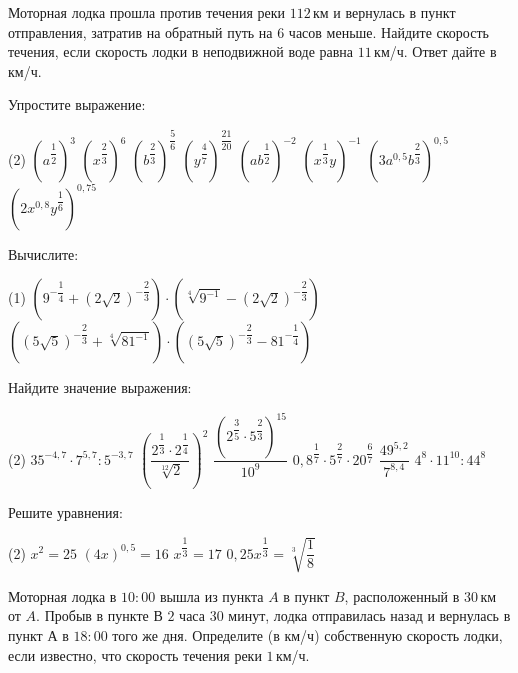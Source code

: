 \begin{class}[number=3]
\begin{listofex}
		\item Моторная лодка прошла против течения реки \(112\) км и вернулась в пункт отправления, затратив на обратный путь на \(6\) часов меньше. Найдите скорость течения, если скорость лодки в неподвижной воде равна \(11\) км/ч. Ответ дайте в км/ч.
	\end{listofex}
\end{class}

\begin{class}[number=4]
	\begin{listofex}
		\item Упростите выражение:
		\begin{tasks}(2)
			\task \( (a^{\dfrac{1}{2}})^3 \)
			\task \( (x^{\dfrac{2}{3}})^6 \)
			\task \( (b^{\dfrac{2}{3}})^{\dfrac{5}{6}} \)
			\task \( (y^{\dfrac{4}{7}})^{\dfrac{21}{20}} \)
			\task \( (ab^{\dfrac{1}{2}})^{-2} \)
			\task \( (x^{\dfrac{1}{3}}y)^{-1} \)
			\task \( (3a^{0,5}b^{\dfrac{2}{3}})^{0,5} \)
			\task \( (2x^{0,8}y^{\dfrac{1}{6}})^{0,75} \)
		\end{tasks}
		\item Вычислите:
		\begin{tasks}(1)
			\task \( ( 9^{-\dfrac{1}{4}}+(2\sqrt{2})^{-\dfrac{2}{3}} ) \cdot ( \sqrt[4]{9^{-1}} - (2\sqrt{2})^{-\dfrac{2}{3}} ) \)
			\task \( ( (5\sqrt{5})^{-\dfrac{2}{3}} + \sqrt[4]{81^{-1}} ) \cdot ( (5\sqrt{5})^{-\dfrac{2}{3}} - 81^{-\dfrac{1}{4}} ) \)
		\end{tasks}
		\item Найдите значение выражения:
		\begin{tasks}(2)
			\task \( 35^{-4,7} \cdot 7^{5,7} : 5^{-3,7} \)
			\task \( \left( \dfrac{2^{\dfrac{1}{3}}\cdot2^{\dfrac{1}{4}}}{\sqrt[12]{2}} \right)^2 \)
			\task \( \dfrac{(2^\dfrac{3}{5}\cdot5^{\dfrac{2}{3}})^{15}}{10^9} \)
			\task \( 0,8^{\dfrac{1}{7}}\cdot5^{\dfrac{2}{7}}\cdot20^{\dfrac{6}{7}} \)
			\task \( \dfrac{49^{5,2}}{7^{8,4}} \)
			\task \( 4^8\cdot11^{10}:44^8 \)
		\end{tasks}
		\item Решите уравнения:
		\begin{tasks}(2)
			\task \( x^2 = 25 \)
			\task \( (4x)^{0,5} = 16 \)
			\task \( x^{\dfrac{1}{3}} = 17 \)
			\task \( 0,25x^{\dfrac{1}{3}} = \sqrt[3]{\dfrac{1}{8}} \)
		\end{tasks}
		\item Моторная лодка в \(10:00\) вышла из пункта \(A\) в пункт \(B\), расположенный в \(30\) км от \(A\). Пробыв в пункте В \(2\) часа \(30\) минут, лодка отправилась назад и вернулась в пункт А в \(18:00\) того же дня. Определите (в км/ч) собственную скорость лодки, если известно, что скорость течения реки \(1\) км/ч.
	\end{listofex}
\end{class}

